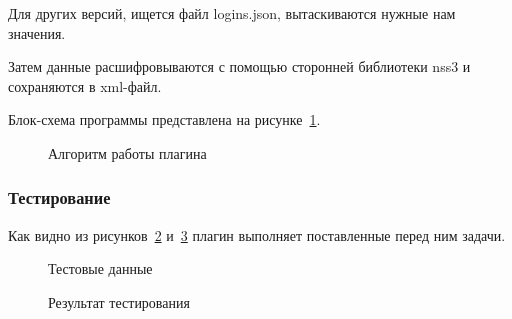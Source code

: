 Для других версий, ищется файл logins.json, вытаскиваются нужные нам значения.

Затем данные расшифровываются с помощью сторонней библиотеки nss3 и сохраняются в xml-файл.

Блок-схема программы представлена на рисунке~\ref{teresh_2:teresh_2}.

\begin{figure}[h!]
\caption{Алгоритм работы плагина}
\label{teresh_2:teresh_2}
\end{figure}

\subsubsection{Тестирование}

Как видно из рисунков~\ref{teresh_3:teresh_3} и~\ref{teresh_4:teresh_4} плагин выполняет поставленные перед ним задачи.

\begin{figure}[h!]
\caption{Тестовые данные}
\label{teresh_3:teresh_3}
\end{figure}

\begin{figure}[h!]
\caption{Результат тестирования}
\label{teresh_4:teresh_4}
\end{figure}

\clearpage
